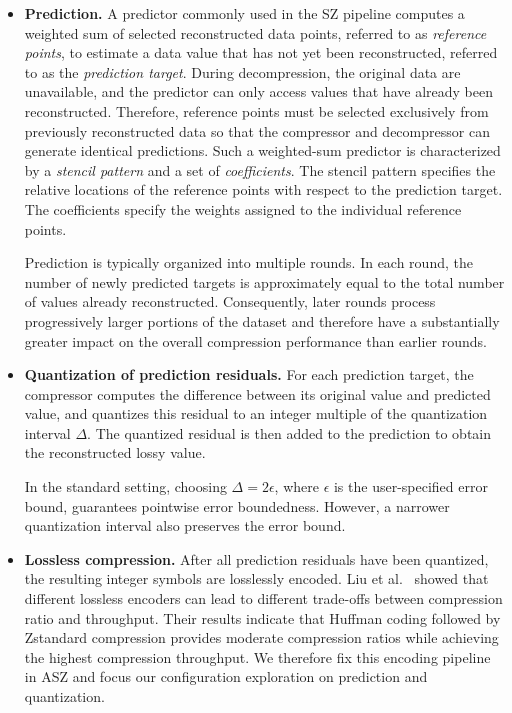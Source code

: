 \begin{itemize}
\item \textbf{Prediction.} A predictor commonly used in the SZ pipeline computes a weighted sum of selected reconstructed data points, referred to as \emph{reference points}, to estimate a data value that has not yet been reconstructed, referred to as the \emph{prediction target}. During decompression, the original data are unavailable, and the predictor can only access values that have already been reconstructed. Therefore, reference points must be selected exclusively from previously reconstructed data so that the compressor and decompressor can generate identical predictions. Such a weighted-sum predictor is characterized by a \emph{stencil pattern} and a set of \emph{coefficients}. The stencil pattern specifies the relative locations of the reference points with respect to the prediction target. The coefficients specify the weights assigned to the individual reference points.

Prediction is typically organized into multiple rounds. In each round, the number of newly predicted targets is approximately equal to the total number of values already reconstructed. Consequently, later rounds process progressively larger portions of the dataset and therefore have a substantially greater impact on the overall compression performance than earlier rounds.

\item \textbf{Quantization of prediction residuals.} For each prediction target, the compressor computes the difference between its original value and predicted value, and quantizes this residual to an integer multiple of the quantization interval $\Delta$. The quantized residual is then added to the prediction to obtain the reconstructed lossy value.

In the standard setting, choosing $\Delta=2\epsilon$, where $\epsilon$ is the user-specified error bound, guarantees pointwise error boundedness. However, a narrower quantization interval also preserves the error bound.

\item \textbf{Lossless compression.} After all prediction residuals have been quantized, the resulting integer symbols are losslessly encoded. Liu et al.~\cite{liu2021improving} showed that different lossless encoders can lead to different trade-offs between compression ratio and throughput. Their results indicate that Huffman coding followed by Zstandard compression provides moderate compression ratios while achieving the highest compression throughput. We therefore fix this encoding pipeline in ASZ and focus our configuration exploration on prediction and quantization.
\end{itemize}

